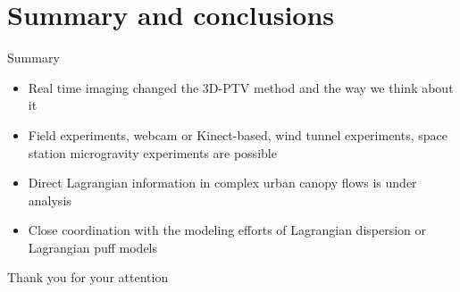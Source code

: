 \documentclass[aspectratio=43]{beamer}
\begin{document}

%




\section{Summary and conclusions}\label{sec:summary}

\begin{frame}{Summary}
\begin{itemize}
\item Real time imaging changed the 3D-PTV method and the way we think about it
\item Field experiments, webcam or Kinect-based, wind tunnel experiments, space station microgravity experiments are possible
\item Direct Lagrangian information in complex urban canopy flows is under analysis
\item Close coordination with the modeling efforts of Lagrangian dispersion or Lagrangian puff models
\end{itemize}
\end{frame}

\begin{frame}{Thank you for your attention}
\end{frame}
\end{document}
